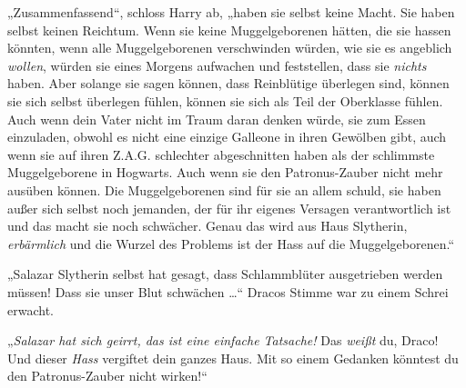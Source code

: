 „Zusammenfassend“, schloss Harry ab, „haben sie selbst keine Macht. Sie haben selbst keinen Reichtum. Wenn sie keine Muggelgeborenen hätten, die sie hassen könnten, wenn alle Muggelgeborenen verschwinden würden, wie sie es angeblich \emph{wollen}, würden sie eines Morgens aufwachen und feststellen, dass sie \emph{nichts} haben. Aber solange sie sagen können, dass Reinblütige überlegen sind, können sie sich selbst überlegen fühlen, können sie sich als Teil der Oberklasse fühlen. Auch wenn dein Vater nicht im Traum daran denken würde, sie zum Essen einzuladen, obwohl es nicht eine einzige Galleone in ihren Gewölben gibt, auch wenn sie auf ihren Z.A.G. schlechter abgeschnitten haben als der schlimmste Muggelgeborene in Hogwarts. Auch wenn sie den Patronus-Zauber nicht mehr ausüben können. Die Muggelgeborenen sind für sie an allem schuld, sie haben außer sich selbst noch jemanden, der für ihr eigenes Versagen verantwortlich ist und das macht sie noch schwächer. Genau das wird aus Haus Slytherin, \emph{erbärmlich} und die Wurzel des Problems ist der Hass auf die Muggelgeborenen.“

„Salazar Slytherin selbst hat gesagt, dass Schlammblüter ausgetrieben werden müssen! Dass sie unser Blut schwächen …“ Dracos Stimme war zu einem Schrei erwacht.

„\emph{Salazar hat sich geirrt, das ist eine einfache Tatsache!} Das \emph{weißt} du, Draco! Und dieser \emph{Hass} vergiftet dein ganzes Haus. Mit so einem Gedanken könntest du den Patronus-Zauber nicht wirken!“

